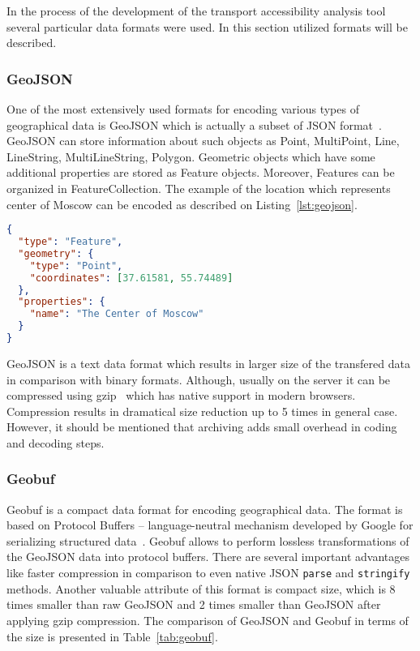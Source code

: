 In the process of the development of the transport accessibility analysis tool several
particular data formats were used. In this section utilized formats will be described.

\subsubsection{GeoJSON}

One of the most extensively used formats for encoding various types of geographical data is
GeoJSON which is actually a subset of JSON format~\cite{geojson:spec}. GeoJSON can store information
about such objects as Point, MultiPoint, Line, LineString, MultiLineString, Polygon. Geometric
objects which have some additional properties are stored as Feature objects. Moreover,
Features can be organized in FeatureCollection. The example of the location which
represents center of Moscow can be encoded as described on Listing~\ref{lst:geojson}.

\begin{lstlisting}[language=json, caption=GeoJSON data example.,
      label={lst:geojson}]
{
  "type": "Feature",
  "geometry": {
    "type": "Point",
    "coordinates": [37.61581, 55.74489]
  },
  "properties": {
    "name": "The Center of Moscow"
  }
}
\end{lstlisting}


GeoJSON is a text data format which results in larger size of the transfered data in comparison
with binary formats. Although, usually on the server it can be compressed using gzip~\cite{gzip}
which has native support in modern browsers. Compression results in dramatical size reduction up to
5 times in general case. However, it should be mentioned that archiving adds small overhead in
coding and decoding steps.

\subsubsection{Geobuf}

Geobuf is a compact data format for encoding geographical data. The format is based on Protocol
Buffers -- language-neutral mechanism developed by Google for serializing structured
data~\cite{protobuf}. Geobuf allows to perform lossless transformations of the GeoJSON data into
protocol buffers. There are several important advantages like faster compression in comparison to
even native JSON \texttt{parse} and \texttt{stringify} methods. Another valuable attribute of this
format is compact size, which is 8 times smaller than raw GeoJSON and 2 times smaller than GeoJSON
after applying gzip compression. The comparison of GeoJSON and Geobuf in terms of the size is
presented in Table~\ref{tab:geobuf}.

